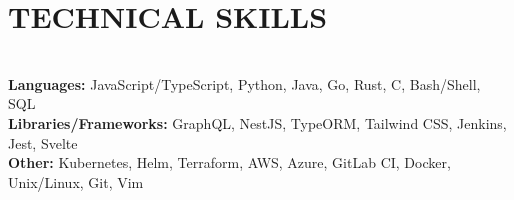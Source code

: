 \documentclass[12pt,letterpaper,roman]{moderncv}
\def \scaleFont {0.945} %
\def \headingSpace {-7.5mm * \real{\scaleFont}} %
\def \skillSpacing {1mm} %
\begin{document}
{\section{TECHNICAL SKILLS} \leavevmode \\[\headingSpace]
{\relscale{\scaleFont}
\textbf{Languages:}
JavaScript/TypeScript,\hspace*{\skillSpacing}
Python,\hspace*{\skillSpacing}
Java,\hspace*{\skillSpacing}
Go,\hspace*{\skillSpacing}
Rust,\hspace*{\skillSpacing}
C,\hspace*{\skillSpacing}
Bash/Shell,\hspace*{\skillSpacing}
SQL\hspace*{\skillSpacing}
\\[0mm]
\textbf{Libraries/Frameworks:}
GraphQL,\hspace*{\skillSpacing}
NestJS,\hspace*{\skillSpacing}
TypeORM,\hspace*{\skillSpacing}
Tailwind CSS,\hspace*{\skillSpacing}
Jenkins,\hspace*{\skillSpacing}
Jest,\hspace*{\skillSpacing}
Svelte\hspace*{\skillSpacing}
\\[0mm]
\textbf{Other:}
Kubernetes,\hspace*{\skillSpacing}
Helm,\hspace*{\skillSpacing}
Terraform,\hspace*{\skillSpacing}
AWS,\hspace*{\skillSpacing}
Azure,\hspace*{\skillSpacing}
GitLab CI,\hspace*{\skillSpacing}
Docker,\hspace*{\skillSpacing}
Unix/Linux,\hspace*{\skillSpacing}
Git,\hspace*{\skillSpacing}
Vim\hspace*{\skillSpacing}}
}
\end{document}
